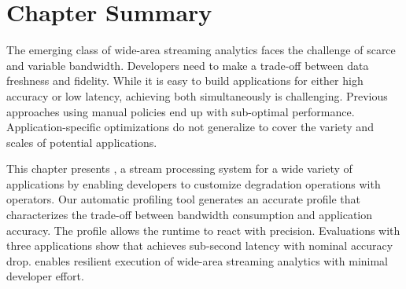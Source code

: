 \section{Chapter Summary}
\label{sec:chapter-summary}

The emerging class of wide-area streaming analytics faces the challenge of
scarce and variable bandwidth. Developers need to make a trade-off between data
freshness and fidelity. While it is easy to build applications for either high
accuracy or low latency, achieving both simultaneously is challenging. Previous
approaches using manual policies end up with sub-optimal
performance. Application-specific optimizations do not generalize to cover the
variety and scales of potential applications.

This chapter presents \awstream{}, a stream processing system for a wide variety
of applications by enabling developers to customize degradation operations with
\maybe{} operators. Our automatic profiling tool generates an accurate profile
that characterizes the trade-off between bandwidth consumption and application
accuracy. The profile allows the runtime to react with precision. Evaluations
with three applications show that \awstream{} achieves sub-second latency with
nominal accuracy drop. \awstream{} enables resilient execution of wide-area
streaming analytics with minimal developer effort.


